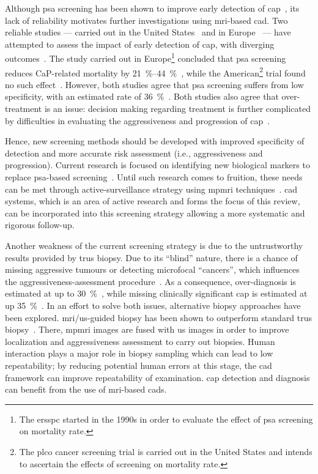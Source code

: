 Although \ac{psa} screening has been shown to improve early detection of
\ac{cap}~\cite{Chou2011}, its lack of reliability motivates further
investigations using \ac{mri}-based \ac{cad}.
Two reliable studies --- carried out in the United States~\cite{Andriole2009}
and in Europe~\cite{Schroeder2012, Hugosson2010} --- have attempted to assess
the impact of early detection of \ac{cap}, with diverging
outcomes~\cite{Chou2011,Heidenreich2013}.
The study carried out in Europe\footnote{The \ac{ersspc} started in the 1990s
  in order to evaluate the effect of \ac{psa} screening on mortality rate.}
concluded that \ac{psa} screening reduces CaP-related mortality by
\SIrange{21}{44}{\percent}~\cite{Schroeder2012, Hugosson2010}, while the
American\footnote{The \ac{plco} cancer screening trial is carried out in the
  United States and intends to ascertain the effects of screening on mortality
  rate.} trial found no such effect~\cite{Andriole2009}.
However, both studies agree that \ac{psa} screening suffers from low
specificity, with an estimated rate of \SI{36}{\percent}~\cite{Schroder2008}.
Both studies also agree that over-treatment is an issue: decision making
regarding treatment is further complicated by difficulties in evaluating the
aggressiveness and progression of \ac{cap}~\cite{Delpierre2013}.

Hence, new screening methods should be developed with improved specificity of
detection and more accurate risk assessment (i.e., aggressiveness and
progression).
Current research is focused on identifying new biological markers to replace
\ac{psa}-based screening~\cite{Bourdoumis2010,Morgan2011,Brenner2013}.
Until such research comes to fruition, these needs can be met through
active-surveillance strategy using \ac{mpmri}
techniques~\cite{Hoeks2011,Moore2013}.
\Ac{cad} systems, which is an area of active research and forms the
focus of this review, can be incorporated into this screening strategy allowing
a more systematic and rigorous follow-up.

Another weakness of the current screening strategy is due to the untrustworthy
results provided by \ac{trus} biopsy.
Due to its ``blind'' nature, there is a chance of missing aggressive tumours or
detecting microfocal ``cancers'', which influences the
aggressiveness-assessment procedure~\cite{Noguchi2001}.
As a consequence, over-diagnosis is estimated at up to
\SI{30}{\percent}~\cite{Haas2007}, while missing clinically significant
\ac{cap} is estimated at up \SI{35}{\percent}~\cite{Taira2010}.
In an effort to solve both issues, alternative biopsy approaches have been
explored.
\ac{mri}/\ac{us}-guided biopsy has been shown to outperform standard \ac{trus}
biopsy~\cite{Delongchamps2013}.
There, \ac{mpmri} images are fused with \ac{us} images in order to improve
localization and aggressiveness assessment to carry out biopsies.
Human interaction plays a major role in biopsy sampling which can lead to low
repeatability; by reducing potential human errors at this stage, the \acs{cad}
framework can improve repeatability of examination.
\ac{cap} detection and diagnosis can benefit from the use of \ac{mri}-based
\acs{cad}s.

